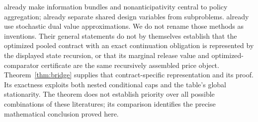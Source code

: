 \citet{RockafellarWets1991} already make information bundles and nonanticipativity central to policy aggregation; \citet{Benders1962} already separate shared design variables from subproblems. \citet{PereiraPinto1991} already use stochastic dual value approximations. We do not rename those methods as inventions. Their general statements do not by themselves establish that the optimized pooled contract with an exact continuation obligation is represented by the displayed state recursion, or that its marginal release value and optimized-comparator certificate are the same recursively assembled price object. Theorem~\ref{thm:bridge} supplies that contract-specific representation and its proof. Its exactness exploits both nested conditional caps and the table's global stationarity. The theorem does not establish priority over all possible combinations of these literatures; its comparison identifies the precise mathematical conclusion proved here.
